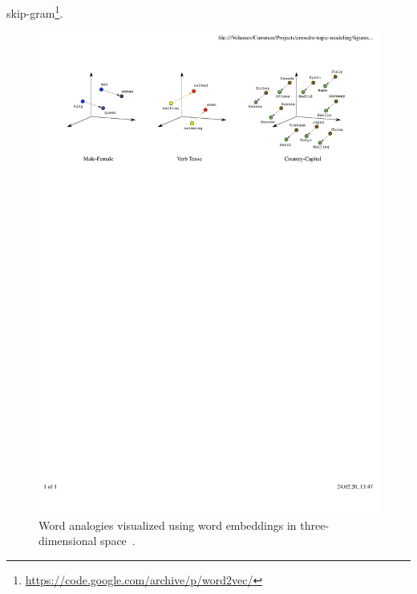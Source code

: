 skip-gram\footnote{\label{word2vec_link}\url{https://code.google.com/archive/p/word2vec/}}.

\begin{figure}[ht]
  \centering
    \includegraphics[width=\textwidth]{figures/word-embedding-relationships.pdf}
    \caption{Word analogies visualized using word embeddings in three-dimensional space \,\cite{google_embeddings_figure}.}
    \label{fig:word_emb_relationships}
\end{figure}
\FloatBarrier

